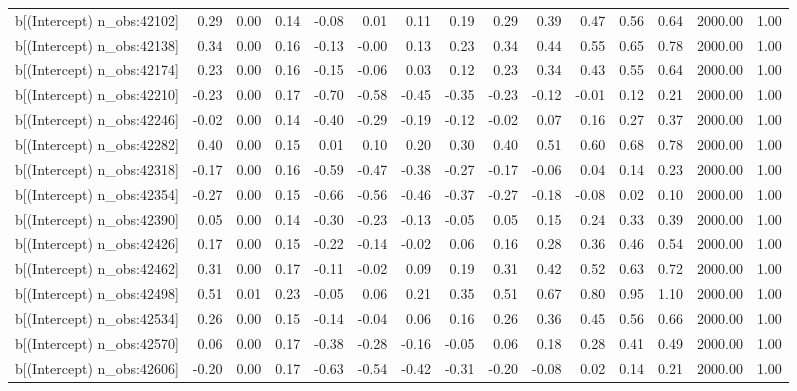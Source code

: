 \begin{table}[ht]
\begin{tabular}{rrrrrrrrrrrrrrr}
  b[(Intercept) n\_obs:42102] & 0.29 & 0.00 & 0.14 & -0.08 & 0.01 & 0.11 & 0.19 & 0.29 & 0.39 & 0.47 & 0.56 & 0.64 & 2000.00 & 1.00 \\ 
  b[(Intercept) n\_obs:42138] & 0.34 & 0.00 & 0.16 & -0.13 & -0.00 & 0.13 & 0.23 & 0.34 & 0.44 & 0.55 & 0.65 & 0.78 & 2000.00 & 1.00 \\ 
  b[(Intercept) n\_obs:42174] & 0.23 & 0.00 & 0.16 & -0.15 & -0.06 & 0.03 & 0.12 & 0.23 & 0.34 & 0.43 & 0.55 & 0.64 & 2000.00 & 1.00 \\ 
  b[(Intercept) n\_obs:42210] & -0.23 & 0.00 & 0.17 & -0.70 & -0.58 & -0.45 & -0.35 & -0.23 & -0.12 & -0.01 & 0.12 & 0.21 & 2000.00 & 1.00 \\ 
  b[(Intercept) n\_obs:42246] & -0.02 & 0.00 & 0.14 & -0.40 & -0.29 & -0.19 & -0.12 & -0.02 & 0.07 & 0.16 & 0.27 & 0.37 & 2000.00 & 1.00 \\ 
  b[(Intercept) n\_obs:42282] & 0.40 & 0.00 & 0.15 & 0.01 & 0.10 & 0.20 & 0.30 & 0.40 & 0.51 & 0.60 & 0.68 & 0.78 & 2000.00 & 1.00 \\ 
  b[(Intercept) n\_obs:42318] & -0.17 & 0.00 & 0.16 & -0.59 & -0.47 & -0.38 & -0.27 & -0.17 & -0.06 & 0.04 & 0.14 & 0.23 & 2000.00 & 1.00 \\ 
  b[(Intercept) n\_obs:42354] & -0.27 & 0.00 & 0.15 & -0.66 & -0.56 & -0.46 & -0.37 & -0.27 & -0.18 & -0.08 & 0.02 & 0.10 & 2000.00 & 1.00 \\ 
  b[(Intercept) n\_obs:42390] & 0.05 & 0.00 & 0.14 & -0.30 & -0.23 & -0.13 & -0.05 & 0.05 & 0.15 & 0.24 & 0.33 & 0.39 & 2000.00 & 1.00 \\ 
  b[(Intercept) n\_obs:42426] & 0.17 & 0.00 & 0.15 & -0.22 & -0.14 & -0.02 & 0.06 & 0.16 & 0.28 & 0.36 & 0.46 & 0.54 & 2000.00 & 1.00 \\ 
  b[(Intercept) n\_obs:42462] & 0.31 & 0.00 & 0.17 & -0.11 & -0.02 & 0.09 & 0.19 & 0.31 & 0.42 & 0.52 & 0.63 & 0.72 & 2000.00 & 1.00 \\ 
  b[(Intercept) n\_obs:42498] & 0.51 & 0.01 & 0.23 & -0.05 & 0.06 & 0.21 & 0.35 & 0.51 & 0.67 & 0.80 & 0.95 & 1.10 & 2000.00 & 1.00 \\ 
  b[(Intercept) n\_obs:42534] & 0.26 & 0.00 & 0.15 & -0.14 & -0.04 & 0.06 & 0.16 & 0.26 & 0.36 & 0.45 & 0.56 & 0.66 & 2000.00 & 1.00 \\ 
  b[(Intercept) n\_obs:42570] & 0.06 & 0.00 & 0.17 & -0.38 & -0.28 & -0.16 & -0.05 & 0.06 & 0.18 & 0.28 & 0.41 & 0.49 & 2000.00 & 1.00 \\ 
  b[(Intercept) n\_obs:42606] & -0.20 & 0.00 & 0.17 & -0.63 & -0.54 & -0.42 & -0.31 & -0.20 & -0.08 & 0.02 & 0.14 & 0.21 & 2000.00 & 1.00 \\ 

\end{tabular}
\end{table}
